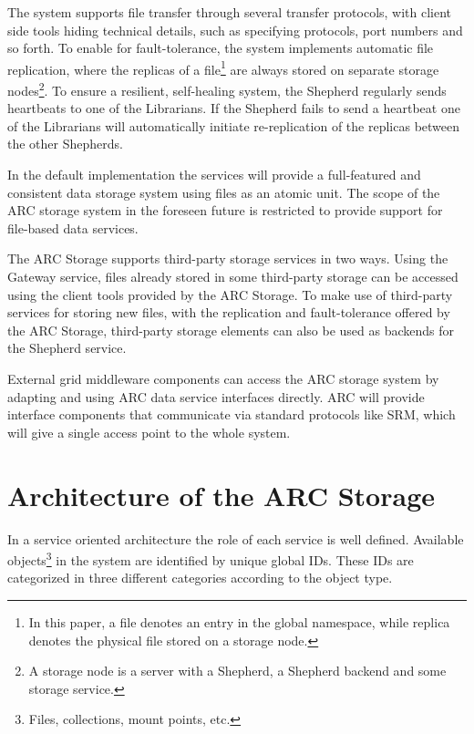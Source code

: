 \documentclass[final]{ieee}
\begin{document}
The system supports file transfer through several transfer protocols,
with client side tools hiding technical
details, such as specifying protocols, port numbers
and so forth. To enable for fault-tolerance, the system implements
automatic file replication, where
the replicas of a file\footnote{In this paper, a file
denotes an entry in the global namespace, while replica denotes the
physical file stored on a storage node.} are always stored on separate
storage nodes\footnote{A
  storage node is a server with a Shepherd, a Shepherd backend
and some storage service.}. To ensure a resilient, self-healing system, the Shepherd
regularly sends heartbeats to one of the Librarians. If the Shepherd fails
to send a heartbeat one of the Librarians will automatically initiate
re-replication of the replicas between the other Shepherds.

In the default implementation the services will provide a
full-featured and consistent data storage system using files as an
atomic unit. The scope of the ARC storage system in the foreseen
future is restricted to provide support for file-based data services.

The ARC Storage supports third-party storage services in two
ways. Using the Gateway service, files already stored in some
third-party storage can be accessed using the client tools provided by
the ARC Storage. To make use of third-party services for storing new
files, with the replication and fault-tolerance offered by the ARC
Storage, third-party storage elements can also be used as backends for the
Shepherd service.

External grid middleware components can
access the ARC storage system by adapting and using ARC data service
interfaces directly. ARC will provide interface
components that communicate via standard protocols like SRM, which
will give a single access point to the whole system.

\section{Architecture of the ARC Storage}
\label{Architecture of the ARC Storage}

In a service oriented architecture
the role of each service is well defined. Available
objects\footnote{Files, collections, mount points, etc.} in the
system are identified by unique global IDs. These IDs are
categorized in three different categories according to the object type.
\end{document}
